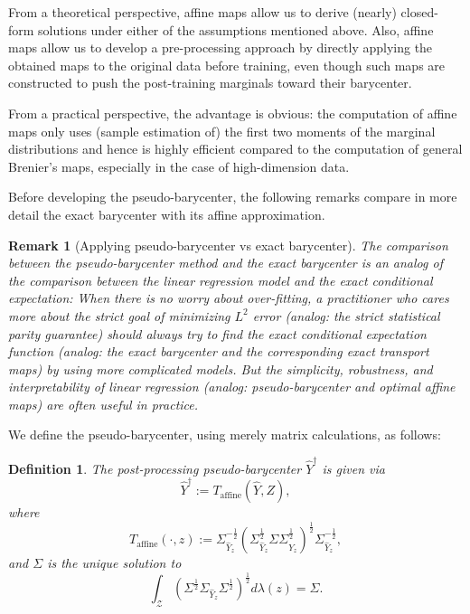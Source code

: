\documentclass[twoside,11pt]{article}
\newtheorem{rema}{Remark}[section]{\bfseries}{\itshape}
\newtheorem{defi}{Definition}[section]{\bfseries}{\itshape}
\begin{document}
From a theoretical perspective, affine maps allow us to derive (nearly) closed-form solutions under either of the assumptions mentioned above.
Also, affine maps allow us to develop a pre-processing approach by directly applying the obtained maps to the original data before training, even though such maps are constructed to push the post-training marginals toward their barycenter.

From a practical perspective, the advantage is obvious: the computation of affine maps only uses (sample estimation of) the first two moments of the marginal distributions and hence is highly efficient compared to the computation of general Brenier's maps, especially in the case of high-dimension data. 

Before developing the pseudo-barycenter, the following remarks  compare in more detail  the exact barycenter with its  affine approximation.

\begin{rema}[Applying pseudo-barycenter vs  exact barycenter] \label{r:Applying Pseudo-barycenter vs the Exact Barycenter}
The comparison between the pseudo-barycenter method and the exact barycenter is an analog of the comparison between the linear regression model and the exact conditional expectation: When there is no worry about over-fitting, a practitioner who cares more about the strict goal of minimizing $L^2$ error (analog: the strict statistical parity guarantee) should always try to find the exact conditional expectation function (analog: the exact barycenter and the corresponding exact transport maps) by using more complicated models. But the simplicity, robustness, and interpretability of linear regression (analog: pseudo-barycenter and optimal affine maps) are often useful in practice.
\end{rema}

We define the pseudo-barycenter, using merely matrix calculations, as follows:

\begin{defi} \label{d:Post-processing Pseudo-barycenter} The post-processing pseudo-barycenter $\hat{Y}^{\dag}$ is given via
\begin{equation}\label{eq:post-processing pseudo-barycenter}
\hat{Y}^{\dag} := T_{\text{affine}}(\hat{Y},Z),
\end{equation}
where
\begin{equation} \label{eq:post-processing maps}
T_{\text{affine}}(\cdot,z) :=  \Sigma_{\hat{Y}_z}^{-\frac{1}{2}} (\Sigma_{\hat{Y}_z}^{\frac{1}{2}} \Sigma \Sigma_{\hat{Y}_z}^{\frac{1}{2}} )^{\frac{1}{2}} \Sigma_{\hat{Y}_z}^{-\frac{1}{2}},
\end{equation}
and $\Sigma$ is the unique solution to
\begin{equation} \label{eq:post-processing bary cov estimation}
\int_{\mathcal{Z}} (\Sigma^{\frac{1}{2}} \Sigma_{\hat{Y}_z} \Sigma^{\frac{1}{2}})^{\frac{1}{2}} d\lambda(z) = \Sigma.
\end{equation}
\end{defi}
\end{document}
